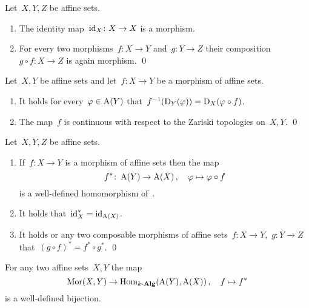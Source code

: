 \begin{lemma}
  Let~$X, Y, Z$ be affine sets.
  \begin{enumerate}
    \item
      The identity map~$\operatorname{id}_X \colon X \to X$ is a morphism.
    \item
      For every two morphisms~$f \colon X \to Y$ and~$g \colon Y \to Z$ their composition~$g \circ f \colon X \to Z$ is again morphism.
    \qed
  \end{enumerate}
\end{lemma}


\begin{lemma}
  Let~$X,Y$ be affine sets and let~$f \colon X \to Y$ be a morphism of affine sets.
  \begin{enumerate}
    \item
      It holds for every~$\varphi \in \operatorname{A}(Y)$ that~$f^{-1}(\operatorname{D}_Y(\varphi)) = \operatorname{D}_X(\varphi \circ f)$.
    \item
      The map~$f$ is continuous with respect to the Zariski topologies on~$X, Y$.
    \qed
  \end{enumerate}
\end{lemma}


\begin{lemma}
  \label{fuctoriality of the coordinate ring}
  Let~$X, Y, Z$ be affine sets.
  \begin{enumerate}
    \item
      If~$f \colon X \to Y$ is a morphism of affine sets then the map
      \[
                f^*
        \colon  \operatorname{A}(Y)
        \to     \operatorname{A}(X) \,,
        \quad   \varphi
        \mapsto \varphi \circ f
      \]
      is a well-defined homomorphism of~.
    \item
      It holds that~$\operatorname{id}_X^* = \operatorname{id}_{\operatorname{A}(X)}$.
    \item
      It holds or any two composable morphisms of affine sets~$f \colon X \to Y$,~$g \colon Y \to Z$ that~$(g \circ f)^* = f^* \circ g^*$.
    \qed
  \end{enumerate}
\end{lemma}


\begin{proposition}
  \label{coordinate ring is fully faithful}
  For any two affine sets~$X,Y$ the map
  \[
            \operatorname{Mor}(X, Y)
    \to     \operatorname{Hom}_{k\text{-}\mathbf{Alg}}( \operatorname{A}(Y), \operatorname{A}(X) ) \,,
    \quad   f
    \mapsto f^*
  \]
  is a well-defined bijection.
\end{proposition}


